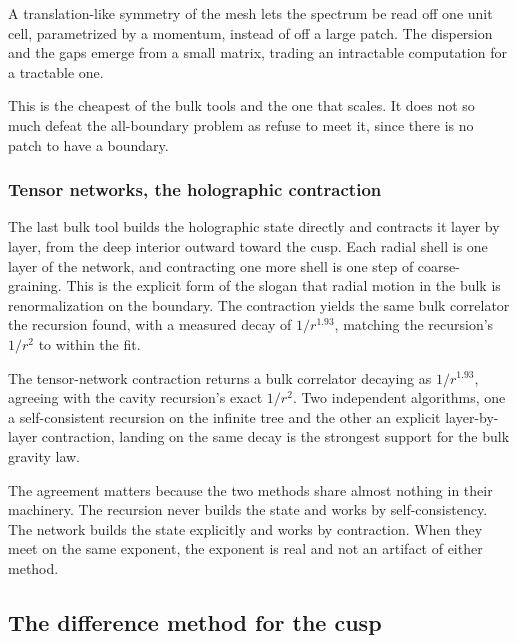 \begin{principle}
A translation-like symmetry of the mesh lets the spectrum be read off one unit cell, parametrized by a momentum, instead of off a large patch. The dispersion and the gaps emerge from a small matrix, trading an intractable computation for a tractable one.
\end{principle}

This is the cheapest of the bulk tools and the one that scales. It does not so much defeat the all-boundary problem as refuse to meet it, since there is no patch to have a boundary.

\subsubsection{Tensor networks, the holographic contraction}

The last bulk tool builds the holographic state directly and contracts it layer by layer, from the deep interior outward toward the cusp. Each radial shell is one layer of the network, and contracting one more shell is one step of coarse-graining. This is the explicit form of the slogan that radial motion in the bulk is renormalization on the boundary. The contraction yields the same bulk correlator the recursion found, with a measured decay of $1/r^{1.93}$, matching the recursion's $1/r^2$ to within the fit.

\begin{result}
The tensor-network contraction returns a bulk correlator decaying as $1/r^{1.93}$, agreeing with the cavity recursion's exact $1/r^2$. Two independent algorithms, one a self-consistent recursion on the infinite tree and the other an explicit layer-by-layer contraction, landing on the same decay is the strongest support for the bulk gravity law.
\end{result}

The agreement matters because the two methods share almost nothing in their machinery. The recursion never builds the state and works by self-consistency. The network builds the state explicitly and works by contraction. When they meet on the same exponent, the exponent is real and not an artifact of either method.

\subsection{The difference method for the cusp}

